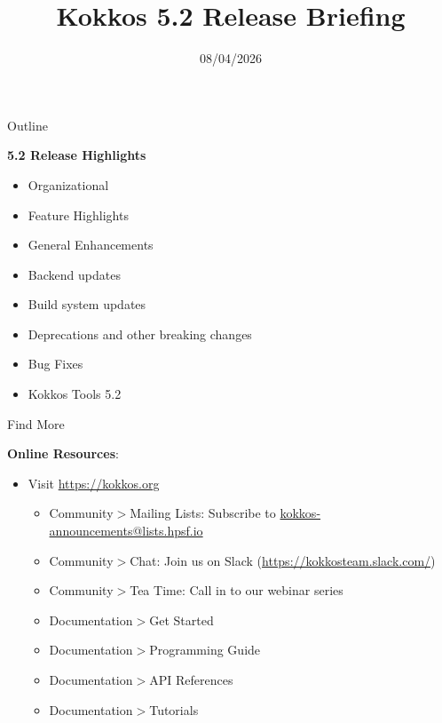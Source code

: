 
\usepackage{tikz}
\graphicspath{{5_2/figures/}}
\usepackage{multicol}
\usepackage{pgfplots}
\usepackage{xfrac}

\def\ornlid{THIS WILL NEED TO BE UPDATED AFTER RESOLUTION}

\title{Kokkos 5.2 Release Briefing}


\date{08/04/2026}





\begin{frame}
  \titlepage
\end{frame}


\begin{frame}[fragile]{Outline}

  \textbf{5.2 Release Highlights}

  \begin{itemize}
    \item{Organizational}
    \item{Feature Highlights}
    \item{General Enhancements}
    \item{Backend updates}
    \item{Build system updates}
    \item{Deprecations and other breaking changes}
    \item{Bug Fixes}
    \item{Kokkos Tools 5.2}
  \end{itemize}

\end{frame}

\begin{frame}{Find More}

  \textbf{Online Resources}:

  \begin{itemize}
  \item Visit \url{https://kokkos.org}
    \begin{itemize}
    \item Community$>$Mailing Lists: Subscribe to \url{kokkos-announcements@lists.hpsf.io}
    \item Community$>$Chat: Join us on Slack (\url{https://kokkosteam.slack.com/})
    \item Community$>$Tea Time: Call in to our webinar series
    \item Documentation$>$Get Started
    \item Documentation$>$Programming Guide
    \item Documentation$>$API References
    \item Documentation$>$Tutorials
    \end{itemize}
  \end{itemize}

\end{frame}

